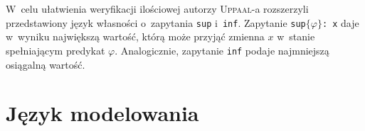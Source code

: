 \documentclass{pracamgr}
\newcommand{\upp}{\textsc{Uppaal}}
\theoremstyle{plain}
\begin{document}
W~celu ułatwienia weryfikacji ilościowej autorzy \upp-a rozszerzyli
przedstawiony język własności o~zapytania \texttt{sup} i~\texttt{inf}.
Zapytanie \texttt{sup$\{\varphi\}$: x} daje w~wyniku największą wartość,
którą może przyjąć zmienna $x$ w~stanie spełniającym predykat $\varphi$.
Analogicznie, zapytanie \texttt{inf} podaje najmniejszą osiągalną wartość.

\chapter{Język modelowania}


{}

\end{document}
